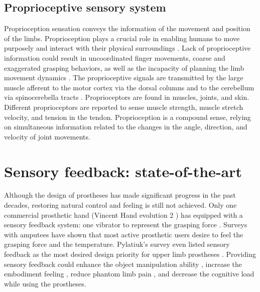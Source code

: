 \subsection{Proprioceptive sensory system}
Proprioception sensation conveys the information of the movement and position of the limbs. Proprioception plays a crucial role in enabling humans to move purposely and interact with their physical surroundings \cite{blank2010identifying}. Lack of proprioceptive information could result in uncoordinated finger movements, coarse and exaggerated grasping behaviors, as well as the incapacity of planning the limb movement dynamics \cite{sainburg1995control}.
The proprioceptive signals are transmitted by the large muscle afferent to the motor cortex via the dorsal columns \cite{favorov1988functional} and to the cerebellum via spinocerebella tracts \cite{ekerot1979information}. 
Proprioceptors are found in muscles, joints, and skin. 
Different proprioceptors are reported to sense muscle strength, muscle stretch velocity, and tension in the tendon. Proprioception is a compound sense, relying on simultaneous information related to the changes in the angle, direction, and velocity of joint movements.



\section{Sensory feedback: state-of-the-art}
Although the design of prostheses has made significant progress in the past decades, restoring natural control and feeling is still not achieved. 
Only one commercial prosthetic hand (Vincent Hand evolution 2 \cite{vincent_system_vincent_evoluation_2}) has equipped with a sensory feedback system: one vibrator to represent the grasping force \cite{vincent_system_vincent_evoluation_2}.
Surveys with amputees have shown that most active prosthetic users desire to feel the grasping force and the temperature. Pylatiuk's survey even listed sensory feedback as the most desired design priority for upper limb prostheses \cite{pylatiuk2007results}. Providing sensory feedback could enhance the object manipulation ability \cite{clemente2016non}, increase the embodiment feeling \cite{marasco2011robotic, mulvey2009use,collins2016ownership}, reduce phantom limb pain \cite{dietrich2012sensory, mulvey2013transcutaneous}, and decrease the cognitive load while using the prostheses\cite{svensson2017review, yamada2016investigation}. 

